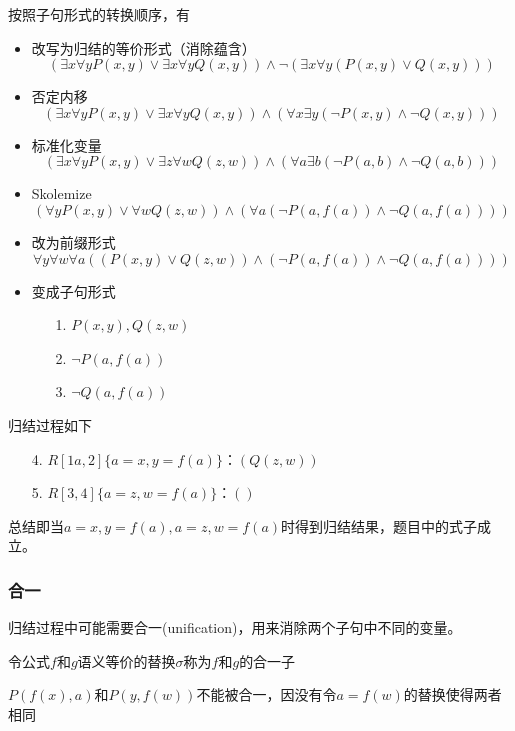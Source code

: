 \begin{analysis}
	按照子句形式的转换顺序，有
    \begin{itemize}
        \item 改写为归结的等价形式（消除蕴含）
        \[(\exists x\forall y P(x,y)\lor\exists x\forall y Q(x,y))\land\lnot
        (\exists x\forall y(P(x,y)\lor Q(x,y)))\]
        \item 否定内移
        \[(\exists x\forall y P(x,y)\lor\exists x\forall y Q(x,y))\land
        (\forall x\exists y (\lnot P(x,y)\land \lnot Q(x,y)))\]
        \item 标准化变量
        \[(\exists x\forall y P(x,y)\lor\exists z\forall w Q(z,w))\land
        (\forall a\exists b (\lnot P(a,b)\land \lnot Q(a,b)))\]
        \item Skolemize
        \[(\forall y P(x,y)\lor \forall w Q(z,w))\land
        (\forall a (\lnot P(a,f(a))\land \lnot Q(a,f(a))))\]
        \item 改为前缀形式
        \[\forall y\forall w\forall a ((P(x,y)\lor Q(z,w))\land
        (\lnot P(a,f(a))\land \lnot Q(a,f(a))))\]
        \item 变成子句形式
        \begin{itemize}
            \item [1.] $P(x,y),Q(z,w)$
            \item [2.] $\lnot P(a,f(a))$
            \item [3.] $\lnot Q(a,f(a))$
        \end{itemize}
    \end{itemize}
    归结过程如下
    \begin{enumerate}
        \item [4.] $R[1a,2]\{a=x,y=f(a)\}$：$(Q(z,w))$
        \item [5.] $R[3,4]\{a=z,w=f(a)\}$：$()$
    \end{enumerate}
    总结即当$a=x,y=f(a),a=z,w=f(a)$时得到归结结果，题目中的式子成立。
\end{analysis}

\subsubsection{合一}
归结过程中可能需要合一(unification)，用来消除两个子句中不同的变量。
\begin{definition}
令公式$f$和$g$语义等价的替换$\sigma$称为$f$和$g$的合一子
\end{definition}
\begin{example}
$P(f(x),a)$和$P(y,f(w))$不能被合一，因没有令$a=f(w)$的替换使得两者相同
\end{example}


